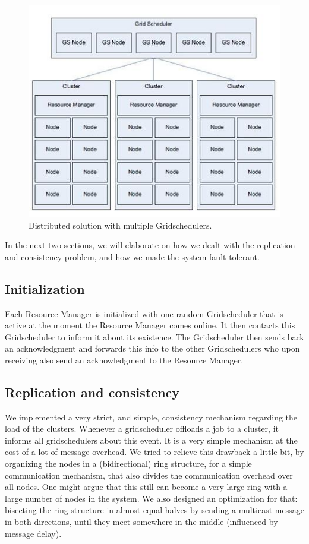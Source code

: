 \documentclass[twocolumn,a4paper]{article}
\begin{document}
\begin{figure}
	\includegraphics[scale=0.7]{distributedGS.jpg}
	\caption{Distributed solution with multiple Gridschedulers.}
\end{figure}

 In the next two sections, we will elaborate on how we dealt with the replication and consistency problem, and how we made the system fault-tolerant.

\subsection{Initialization}
Each Resource Manager is initialized with one random Gridscheduler that is active at the moment the Resource Manager comes online. It then contacts this Gridscheduler to inform it about its existence. The Gridscheduler then sends back an acknowledgment and forwards this info to the other Gridschedulers who upon receiving also send an acknowledgment to the Resource Manager.

\subsection{Replication and consistency}
We implemented a very strict, and simple, consistency mechanism regarding the load of the clusters. Whenever a gridscheduler offloads a job to a cluster, it informs all gridschedulers about this event. It is a very simple mechanism at the cost of a lot of message overhead. We tried to relieve this drawback a little bit, by organizing the nodes in a (bidirectional) ring structure, for a simple communication mechanism, that also divides the communication overhead over all nodes. One might argue that this still can become a very large ring with a large number of nodes in the system. We also designed an optimization for that: bisecting the ring structure in almost equal halves by sending a multicast message in both directions, until they meet somewhere in the middle (influenced by message delay).
\end{document}

